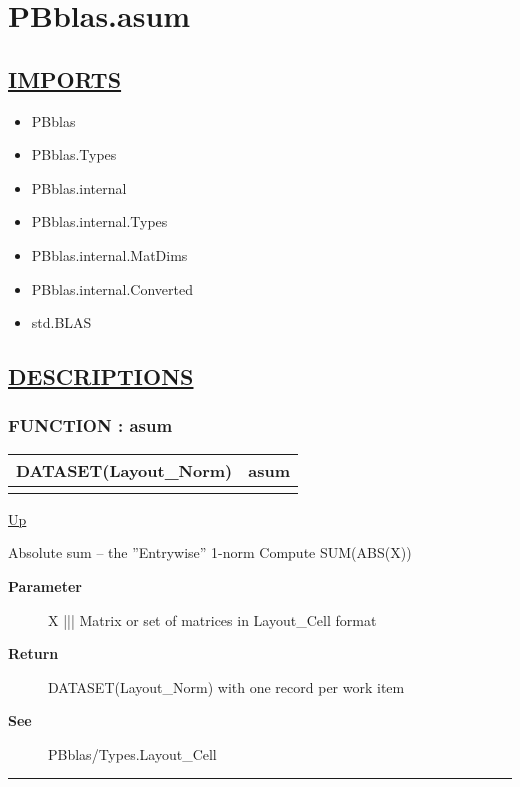 \chapter*{PBblas.asum}
\hypertarget{ecldoc:toc:PBblas.asum}{}

\section*{\underline{IMPORTS}}
\begin{itemize}
\item PBblas
\item PBblas.Types
\item PBblas.internal
\item PBblas.internal.Types
\item PBblas.internal.MatDims
\item PBblas.internal.Converted
\item std.BLAS
\end{itemize}

\section*{\underline{DESCRIPTIONS}}
\subsection*{FUNCTION : asum}
\hypertarget{ecldoc:pbblas.asum}{}

{\renewcommand{\arraystretch}{1.5}
\begin{tabularx}{\textwidth}{|>{\raggedright\arraybackslash}l|X|}
\hline
\hspace{0pt}DATASET(Layout\_Norm) & asum \\
\hline
\multicolumn{2}{|>{\raggedright\arraybackslash}X|}{\hspace{0pt}(DATASET(Layout\_Cell) X)} \\
\hline
\end{tabularx}
}

\hyperlink{ecldoc:toc:PBblas}{Up}

\par
Absolute sum -- the ''Entrywise'' 1-norm Compute SUM(ABS(X))

\par
\begin{description}
\item [\textbf{Parameter}] X ||| Matrix or set of matrices in Layout\_Cell format
\item [\textbf{Return}] DATASET(Layout\_Norm) with one record per work item
\item [\textbf{See}] PBblas/Types.Layout\_Cell
\end{description}

\rule{\textwidth}{0.4pt}
